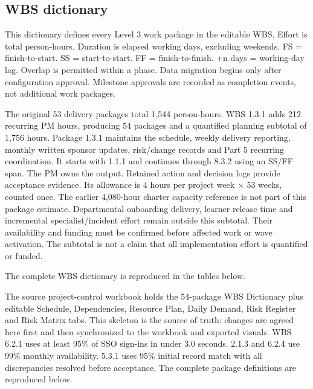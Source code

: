 \subsection{WBS dictionary}\label{sec:2.2}
This dictionary defines every Level 3 work package in the editable WBS. Effort is total person-hours. Duration is elapsed working days, excluding weekends. FS = finish-to-start. SS = start-to-start. FF = finish-to-finish. +n days = working-day lag. Overlap is permitted within a phase. Data migration begins only after configuration approval. Milestone approvals are recorded as completion events, not additional work packages.


The original 53 delivery packages total 1,544 person-hours. WBS 1.3.1 adds 212 recurring PM hours, producing 54 packages and a quantified planning subtotal of 1,756 hours. Package 1.3.1 maintains the schedule, weekly delivery reporting, monthly written sponsor updates, risk/\allowbreak{}change records and Part 5 recurring coordination. It starts with 1.1.1 and continues through 8.3.2 using an SS/\allowbreak{}FF span. The PM owns the output. Retained action and decision logs provide acceptance evidence. Its allowance is 4 hours per project week \(\times\) 53 weeks, counted once. The earlier 4,080-hour charter capacity reference is not part of this package estimate. Departmental onboarding delivery, learner release time and incremental specialist/\allowbreak{}incident effort remain outside this subtotal. Their availability and funding must be confirmed before affected work or wave activation. The subtotal is not a claim that all implementation effort is quantified or funded.


The complete WBS dictionary is reproduced in the tables below.


The source project-control workbook holds the 54-package WBS Dictionary plus editable Schedule, Dependencies, Resource Plan, Daily Demand, Risk Register and Risk Matrix tabs. This skeleton is the source of truth: changes are agreed here first and then synchronized to the workbook and exported visuals. WBS 6.2.1 uses at least 95\% of SSO sign-ins in under 3.0 seconds. 2.1.3 and 6.2.4 use 99\% monthly availability. 5.3.1 uses 95\% initial record match with all discrepancies resolved before acceptance. The complete package definitions are reproduced below.

